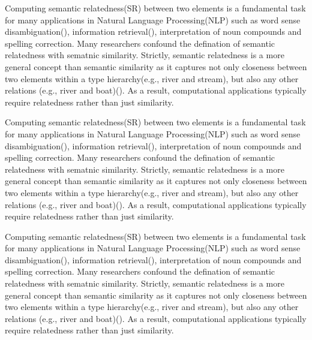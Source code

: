 Computing semantic relatedness(SR) between two elements is a fundamental 
task for many applications in Natural Language Processing(NLP) such as 
word sense disambiguation(\cite{}), information retrieval(\cite{}), 
interpretation of noun compounds and spelling correction. Many researchers
confound the defination of semantic relatedness with sematnic similarity.
Strictly, semantic relatedness is a more general concept than semantic 
similarity as it captures not only closeness between two elements within
a type hierarchy(e.g., river and stream), but also any other relations
(e.g., river and boat)(\cite{BudanitskyH06}). As a result, computational
applications typically require relatedness rather than just similarity.

Computing semantic relatedness(SR) between two elements is a fundamental 
task for many applications in Natural Language Processing(NLP) such as 
word sense disambiguation(\cite{}), information retrieval(\cite{}), 
interpretation of noun compounds and spelling correction. Many researchers
confound the defination of semantic relatedness with sematnic similarity.
Strictly, semantic relatedness is a more general concept than semantic 
similarity as it captures not only closeness between two elements within
a type hierarchy(e.g., river and stream), but also any other relations
(e.g., river and boat)(\cite{BudanitskyH06}). As a result, computational
applications typically require relatedness rather than just similarity.

Computing semantic relatedness(SR) between two elements is a fundamental 
task for many applications in Natural Language Processing(NLP) such as 
word sense disambiguation(\cite{}), information retrieval(\cite{}), 
interpretation of noun compounds and spelling correction. Many researchers
confound the defination of semantic relatedness with sematnic similarity.
Strictly, semantic relatedness is a more general concept than semantic 
similarity as it captures not only closeness between two elements within
a type hierarchy(e.g., river and stream), but also any other relations
(e.g., river and boat)(\cite{BudanitskyH06}). As a result, computational
applications typically require relatedness rather than just similarity.